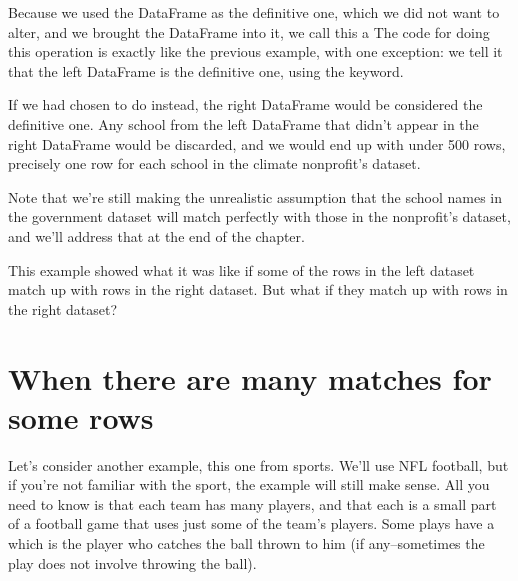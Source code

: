 \documentclass[letterpaper,10pt,english]{sphinxmanual}
\begin{document}
Because we used the  DataFrame as the definitive one, which we did not want to alter, and we brought the  DataFrame into it, we call this a   The code for doing this operation is exactly like the previous  example, with one exception: we tell it that the left DataFrame is the definitive one, using the  keyword.

\begin{sphinxVerbatim}[commandchars=\\\{\}]
    
       
\end{sphinxVerbatim}

If we had chosen to do  instead, the right DataFrame would be considered the definitive one.  Any school from the left DataFrame that didn’t appear in the right DataFrame would be discarded, and we would end up with under 500 rows, precisely one row for each school in the climate nonprofit’s dataset.

Note that we’re still making the unrealistic assumption that the school names in the government dataset will match perfectly with those in the nonprofit’s dataset, and we’ll address that at the end of the chapter.

This example showed what it was like if some of the rows in the left dataset match up with  rows in the right dataset.  But what if they match up with  rows in the right dataset?


\section{When there are many matches for some rows}
\label{\detokenize{chapter-12-concat-and-merge:when-there-are-many-matches-for-some-rows}}
Let’s consider another example, this one from sports.  We’ll use NFL football, but if you’re not familiar with the sport, the example will still make sense.  All you need to know is that each team has many players, and that each  is a small part of a football game that uses just some of the team’s players.  Some plays have a  which is the player who catches the ball thrown to him (if any–sometimes the play does not involve throwing the ball).
\end{document}
